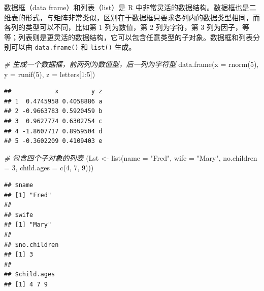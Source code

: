 \documentclass[
  b5paper,
  UTF8,twoside]{book}
\newenvironment{Shaded}{\begin{snugshade}}{\end{snugshade}}
\newcommand{\AttributeTok}[1]{\textcolor[rgb]{0.77,0.63,0.00}{#1}}
\newcommand{\CommentTok}[1]{\textcolor[rgb]{0.56,0.35,0.01}{\textit{#1}}}
\newcommand{\DecValTok}[1]{\textcolor[rgb]{0.00,0.00,0.81}{#1}}
\newcommand{\FunctionTok}[1]{\textcolor[rgb]{0.00,0.00,0.00}{#1}}
\newcommand{\NormalTok}[1]{#1}
\newcommand{\OtherTok}[1]{\textcolor[rgb]{0.56,0.35,0.01}{#1}}
\newcommand{\SpecialCharTok}[1]{\textcolor[rgb]{0.00,0.00,0.00}{#1}}
\newcommand{\StringTok}[1]{\textcolor[rgb]{0.31,0.60,0.02}{#1}}
\begin{document}
数据框（data frame）和列表（list）是 R 中非常灵活的数据结构。数据框也是二维表的形式，与矩阵非常类似，区别在于数据框只要求各列内的数据类型相同，而各列的类型可以不同，比如第 1 列为数值，第 2 列为字符，第 3 列为因子，等等；列表则是更灵活的数据结构，它可以包含任意类型的子对象。数据框和列表分别可以由 \texttt{data.frame()} 和 \texttt{list()} 生成。

\begin{Shaded}
\begin{Highlighting}[]
\CommentTok{\# 生成一个数据框，前两列为数值型，后一列为字符型}
\FunctionTok{data.frame}\NormalTok{(}\AttributeTok{x =} \FunctionTok{rnorm}\NormalTok{(}\DecValTok{5}\NormalTok{), }\AttributeTok{y =} \FunctionTok{runif}\NormalTok{(}\DecValTok{5}\NormalTok{), }\AttributeTok{z =}\NormalTok{ letters[}\DecValTok{1}\SpecialCharTok{:}\DecValTok{5}\NormalTok{])}
\end{Highlighting}
\end{Shaded}

\begin{verbatim}
##            x         y z
## 1  0.4745958 0.4058886 a
## 2 -0.9663783 0.5920459 b
## 3  0.9627774 0.6302754 c
## 4 -1.8607717 0.8959504 d
## 5 -0.3602209 0.4109403 e
\end{verbatim}

\begin{Shaded}
\begin{Highlighting}[]
\CommentTok{\# 包含四个子对象的列表}
\NormalTok{(Lst }\OtherTok{\textless{}{-}} \FunctionTok{list}\NormalTok{(}\AttributeTok{name =} \StringTok{"Fred"}\NormalTok{, }\AttributeTok{wife =} \StringTok{"Mary"}\NormalTok{, }\AttributeTok{no.children =} \DecValTok{3}\NormalTok{, }\AttributeTok{child.ages =} \FunctionTok{c}\NormalTok{(}\DecValTok{4}\NormalTok{, }\DecValTok{7}\NormalTok{, }\DecValTok{9}\NormalTok{)))}
\end{Highlighting}
\end{Shaded}

\begin{verbatim}
## $name
## [1] "Fred"
## 
## $wife
## [1] "Mary"
## 
## $no.children
## [1] 3
## 
## $child.ages
## [1] 4 7 9
\end{verbatim}

\begin{Shaded}
\end{Shaded}
\end{document}
